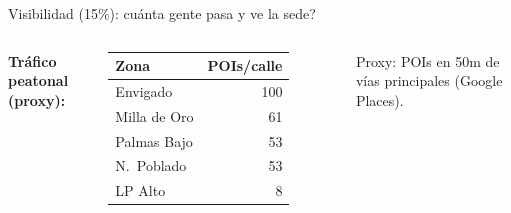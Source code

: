 \documentclass[aspectratio=169, 11pt]{beamer}
\begin{document}
\begin{frame}{\textcolor{vis}{Visibilidad (15\%)}: \textquestiondown cu\'{a}nta gente pasa y ve la sede?}
\begin{columns}[T]
\vspace{2pt}
{\scriptsize\textbf{Tr\'{a}fico peatonal (proxy):}}
\vspace{1pt}

{\tiny
\begin{tabular}{@{}lr@{}}
\toprule
\textbf{Zona} & \textbf{POIs/calle} \\
\midrule
Envigado & 100 \\
Milla de Oro & 61 \\
Palmas Bajo & 53 \\
N.\ Poblado & 53 \\
LP Alto & 8 \\
\bottomrule
\end{tabular}
}

{\tiny Proxy: POIs en 50m de v\'{i}as principales (Google Places).}
\end{columns}
\end{frame}
\end{document}
